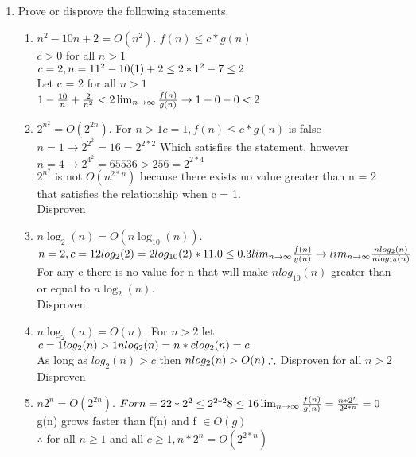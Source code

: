 \documentclass[11pt]{amsart}
\begin{document}
\begin{enumerate}
\item Prove or disprove the following statements.
\begin{enumerate}
\item $n^2 - 10n + 2 = O(n^2)$.
\subitem $f(n)\leq c*g(n)$\\$c>0$ for all $n>1$\\$c=2, n=1\\1^2-10(1)+2\leq 2*1^2\\-7\leq 2$\\Let c = 2 for all $n > 1$\\$1-\frac{10}{n}+\frac{2}{n^2}<2\\\lim_{n \to \infty}\frac{f(n)}{g(n)}\rightarrow 1 - 0 - 0 < 2$  
\item $2^{n^2} = O(2^{2n})$.
\subitem For $n > 1 c = 1, f(n)\leq c*g(n)$ is false\\$n=1 \rightarrow 2^{2^2} = 16 = 2^{2*2}$ Which satisfies the statement, however\\$n = 4 \rightarrow 2^{4^2} = 65536 > 256 = 2^{2*4}$\\$2^{n^2}$ is not $O(n^{2*n})$ because there exists no value greater than n = 2 that satisfies the relationship when c = 1.\\Disproven
\item $n\log_2(n) = O(n\log_{10}(n))$.
\subitem $n = 2, c = 1\\2log_2(2) = 2log_{10}(2)*1\\1.0 \leq 0.3\\lim_{n \to \infty}\frac{f(n)}{g(n)} \rightarrow lim_{n \to \infty}\frac{nlog_2(n)}{nlog_{10}(n)}$\\For any c there is no value for n that will make $nlog_{10}(n)$ greater than or equal to $n\log_2(n)$.\\Disproven
\item $n\log_2(n) = O(n)$.
\subitem For $n>2$ let $c = 1\\log_2(n) > 1\\nlog_2(n)=n*c\\log_2(n)=c$\\As long as $log_2(n) > c$ then $nlog_2(n) > O(n)\\\therefore$ Disproven for all $n>2$ \\Disproven
\item $n2^n = O(2^{2n})$.
\subitem $For n = 2\\2*2^2 \leq 2^{2*2}\\8 \leq 16\\\lim_{n \to \infty}\frac{f(n)}{g(n)} =\frac{n*2^n}{2^{2*n}} = 0$\\g(n) grows faster than f(n) and f $\in O(g)$\\$\therefore$ for all $n\geq 1$ and all $c \geq 1, n*2^n = O(2^{2*n})$
\end{enumerate}





\end{enumerate}
\end{document}
